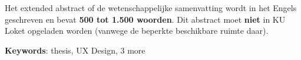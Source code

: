 
Het extended abstract of de wetenschappelijke samenvatting wordt in het Engels geschreven en bevat {\bf 500 tot 1.500 woorden}. Dit abstract moet {\bf niet} in KU Loket opgeladen worden (vanwege de beperkte beschikbare ruimte daar).

\textbf{Keywords}: thesis, UX Design, 3 more
